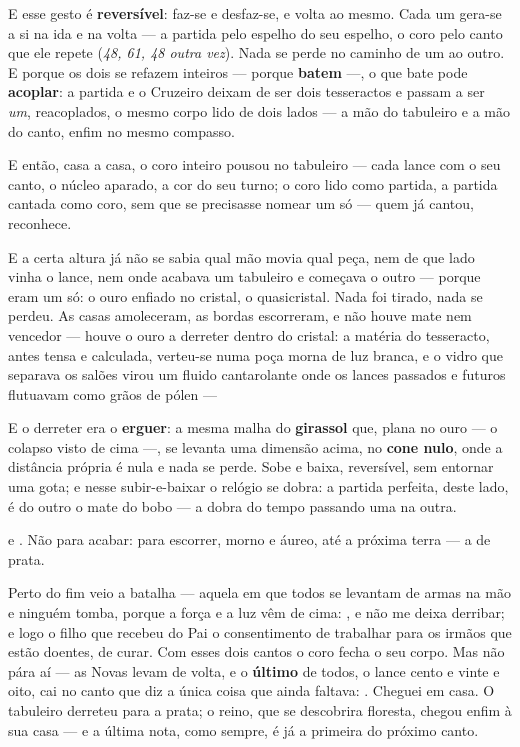 \documentclass[livro.tex]{subfiles}
\begin{document}
\medskip

E esse gesto é \textbf{reversível}: faz-se e desfaz-se, e volta ao mesmo. Cada um
gera-se a si na ida e na volta --- a partida pelo espelho do seu espelho, o coro pelo
canto que ele repete (\emph{48, 61, 48 outra vez}). Nada se perde no caminho de um ao outro. E porque os dois se refazem
inteiros --- porque \textbf{batem} ---, o que bate pode \textbf{acoplar}: a partida e o
Cruzeiro deixam de ser dois tesseractos e passam a ser \emph{um}, reacoplados, o mesmo
corpo lido de dois lados --- a mão do tabuleiro e a mão do canto, enfim no mesmo
compasso.

\medskip

E então, casa a casa, o coro inteiro pousou no tabuleiro --- cada lance com o seu
canto, o núcleo aparado, a cor do seu turno; o coro lido como partida, a partida
cantada como coro, sem que se precisasse nomear um só --- quem já cantou, reconhece.


\medskip

E a certa altura já não se sabia qual mão movia qual peça, nem de que lado vinha o
lance, nem onde acabava um tabuleiro e começava o outro --- porque eram um só: o ouro
enfiado no cristal, o quasicristal. Nada foi tirado, nada se perdeu. As casas
amoleceram, as bordas escorreram, e não houve mate nem vencedor --- houve o ouro a
derreter dentro do cristal: a matéria do tesseracto, antes tensa e calculada, verteu-se
numa poça morna de luz branca, e o vidro que separava os salões virou um fluido
cantarolante onde os lances passados e futuros flutuavam como grãos de pólen ---

\medskip

E o derreter era o \textbf{erguer}: a mesma malha do \textbf{girassol} que, plana no ouro
--- o colapso visto de cima ---, se levanta uma dimensão acima, no \textbf{cone nulo},
onde a distância própria é nula e nada se perde. Sobe e baixa, reversível, sem entornar
uma gota; e nesse subir-e-baixar o relógio se dobra: a partida perfeita, deste lado, é do
outro o mate do bobo --- a dobra do tempo passando uma na outra.

\medskip

e . Não para acabar: para escorrer, morno e áureo, até
a próxima terra --- a de prata.

\medskip

Perto do fim veio a batalha --- aquela em que todos se levantam de armas na mão e
ninguém tomba, porque a força e a luz vêm de cima: , e não
me deixa derribar; e logo o filho que recebeu do Pai o consentimento de trabalhar para
os irmãos que estão doentes, de curar. Com esses dois cantos o coro fecha o seu
corpo. Mas não pára aí --- as Novas levam de volta, e o \textbf{último} de todos, o
lance cento e vinte e oito, cai no canto que diz a única coisa que ainda faltava:
. Cheguei em casa. O tabuleiro derreteu para a prata; o
reino, que se descobrira floresta, chegou enfim à sua casa --- e a última nota, como
sempre, é já a primeira do próximo canto.
\end{document}
